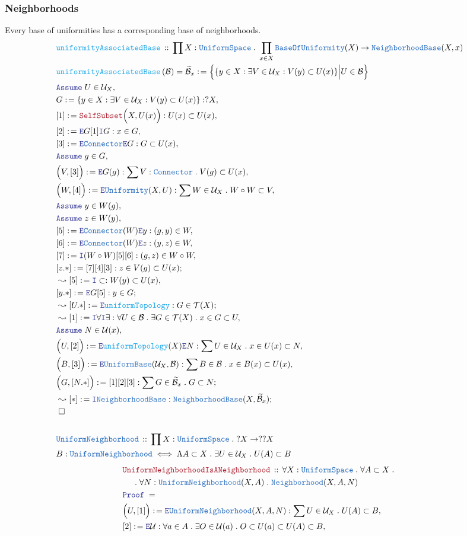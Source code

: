\documentclass[12pt]{scrartcl}
\newcommand{\TYPE}[1]{\textcolor{NavyBlue}{\mathtt{#1}}}
\newcommand{\FUNC}[1]{\textcolor{Cerulean}{\mathtt{#1}}}
\newcommand{\LOGIC}[1]{\textcolor{Blue}{\mathtt{#1}}}
\newcommand{\THM}[1]{\textcolor{Maroon}{\mathtt{#1}}}
\renewcommand{\.}{\; . \;}
\newcommand{\de}{: \kern 0.1pc =}
\newcommand{\Act}[1]{\left( #1 \right)}
\newcommand{\Theorem}[2]{& \THM{#1} \, :: \, #2 \\ & \Proof = \\ }
\newcommand{\DeclareType}[2]{& \TYPE{#1} \, :: \, #2 \\}
\newcommand{\DefineType}[3]{& #1 : \TYPE{#2} \iff #3 \\}
\newcommand{\DeclareFunc}[2]{& \FUNC{#1} \, :: \, #2 \\}
\newcommand{\DefineNamedFunc}[4]{&  \FUNC{#1}\Act{#2} = #3 \de #4 \\}
\newcommand{\NewLine}{\\ & \kern 1pc}
\newcommand{\Page}[1]{ \begin{align*} #1 \end{align*}   }
\newcommand{\Say}[3]{& #1 \de #2 : #3, \\}
\newcommand{\Conclude}[3]{& #1 \de #2 : #3; \\}
\newcommand{\Derive}[3]{& \leadsto #1 \de #2 : #3, \\}
\newcommand{\DeriveConclude}[3]{& \leadsto #1 \de #2 : #3 ; \\}
\newcommand{\AssumeIn}[2]{& \LOGIC{Assume} \; #1 \in #2, \\}
\newcommand{\Intro}{\LOGIC{I}}
\newcommand{\Elim}{\LOGIC{E}}
\newcommand{\QED}{\; \square}
\newcommand{\EndProof}{& \QED \\}
\newcommand{\Proof}{\LOGIC{Proof} \; }
\newcommand{\B}{\mathcal{B}}
\newcommand{\NbhdBase}{\TYPE{NeighborhoodBase}}
\newcommand{\T}{\mathcal{T}}
\renewcommand{\U}{\mathcal{U}}
\newcommand{\Connector}{\TYPE{Connector}}
\newcommand{\Unif}{\TYPE{Uniformity}}
\newcommand{\US}{\TYPE{UniformSpace}}
\newcommand{\UB}{\TYPE{UniformBase}}
\newcommand{\BofU}{\TYPE{BaseOfUniformity}}
\newcommand{\UNbhd}{\TYPE{UniformNeighborhood}}
\begin{document}
\subsubsection{Neighborhoods}
Every base of uniformities has a corresponding base of neighborhoods.
\Page{
	\DeclareFunc{uniformityAssociatedBase}
	{
		\prod X : \US \.
		\prod_{x \in X}
		\BofU(X) \to 
		\NbhdBase(X,x)  
	}
	\DefineNamedFunc{uniformityAssociatedBase}
	{\B}{\widetilde{\B}_x}
	{
		\Big\{  
			\{ y \in X : \exists V \in \U_X : V(y) \subset U(x) \} \Big| 
		U \in \B  \Big\}
	}
	\AssumeIn{U}{\U_X}
	\Say{G}{\{ y \in X : \exists V \in \U_X : V(y) \subset U(x)  \}}{?X}
	\Say{[1]}{\THM{SelfSubset}\Big( X, U(x) \Big)}
	{
		U(x) \subset U(x)
	}
	\Say{[2]}{\Elim G [1] \Intro G}
	{
		x \in G
	}
	\Say{[3]}{\Elim \Connector \Elim G }
	{
		G \subset U(x)
	}
	\AssumeIn{g}{G}
	\Say{\Big(V,[3]\Big)}{\Elim G(g)}
	{
		\sum V : \Connector \.
		V(g) \subset U(x)
	}
	\Say{\Big(W,[4]\Big)}{\Elim \Unif(X,U)}
	{
		\sum W \in \U_X \.
		W \circ W \subset V 
	}
	\AssumeIn{y}{W(g)}
	\AssumeIn{z}{W(y)}
	\Say{[5]}{\Elim \Connector(W) \Elim y}
	{
		(g,y) \in W
	}
	\Say{[6]}{\Elim \Connector(W) \Elim z}
	{
		(y,z) \in W
	}
	\Say{[7]}{\Intro (W \circ W)[5][6]}{(g,z) \in W \circ W }
	\Conclude{[z.*]}{[7][4][3]}{z \in V(g) \subset U(x)}
	\Derive{[5]}{\Intro \subset }{ W(y) \subset U(x)  }
	\Conclude{[y.*]}{\Elim G [5]}
	{
		 y \in G
	}
	\DeriveConclude{[U.*]}{\Elim \FUNC{uniformTopology}}
	{
		G \in \T(X)
	}
	\Derive{[1]}{
		\Intro \forall \Intro \exists
	}
	{
		\forall U \in \B \.  
		\exists G \in \T(X) \.
		x \in G \subset U
	}
	\AssumeIn{N}{\U(x)}
	\Say{\Big( U,[2]\Big)}
	{
		\Elim \FUNC{uniformTopology}(X)\Elim N
	}
	{
		\sum U \in \U_X \.   x \in U(x) \subset N   
	}
	\Say{\Big( B,[3]\Big)}
	{
		\Elim \UB(\U_X,\B)
	}
	{
		\sum B \in \B \.   x \in  B(x) \subset U(x)   
	}
	\Conclude{\Big(G,[N.*]\Big)}{[1][2][3]}
	{
		\sum G \in \widetilde{\B}_x \. G \subset N 
	}
	\DeriveConclude{[*]}{\Intro \NbhdBase}
	{
		\NbhdBase(X,\widetilde{\B}_x)
	}
	\EndProof
	\\
	\DeclareType{\UNbhd}
	{
		\prod X : \US \. ?X \to ??X	
	}
	\DefineType{B}{\UNbhd}
	{
		\Lambda A \subset X \. 
		\exists U \in \U_X \.
		U(A) \subset B
	}
}\Page{
	\Theorem{UniformNeighborhoodIsANeighborhood}
	{
		\forall X : \US \.
		\forall A \subset X \. \NewLine \.
		\forall N : \UNbhd(X,A) \.
		\TYPE{Neighborhood}(X,A,N)
	}
	\Say{\Big(U,[1]\Big)}{\Elim \UNbhd(X,A,N)}
	{
		\sum U \in \U_X \. U(A) \subset B
	}
	\Say{[2]}{\Elim \U}
	{
		\forall a \in A \. 
		\exists O \in \U(a) \.
		O \subset U(a) \subset U(A) \subset B
}}
\end{document}
